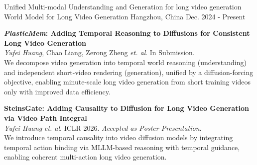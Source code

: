 

\begin{cventries}

  \cventry
    {Unified Multi-modal Understanding and Generation for long video generation} %
    {World Model for Long Video Generation} %
    {Hangzhou, China} %
    {Dec. 2024 - Present} %
    {
      \begin{cvitems} %
        \item {
        \textbf{\textit{PlasticMem}: Adding Temporal Reasoning to Diffusions for Consistent Long Video Generation} \\
        \textit{Yufei Huang}, Chao Liang, Zerong Zheng \textit{et. al}.  \space \space \space In Submission.\\
        We decompose video generation into temporal world reasoning (understanding) and independent short-video rendering (generation), unified by a diffusion-forcing objective, enabling minute-scale long video generation from short training videos only with improved data efficiency.
        }
        \item {
        \textbf{SteinsGate: Adding Causality to Diffusion for Long Video Generation via Video Path Integral} \\
        \textit{Yufei Huang} \textit{et. al}. \space \space ICLR 2026. \space \space \textit{Accepted as Poster Presentation}. \\
        We introduce temporal causality into video diffusion models by integrating temporal action binding via MLLM-based reasoning with temporal guidance, enabling coherent multi-action long video generation.
        }
      \end{cvitems}
    }


\end{cventries}
